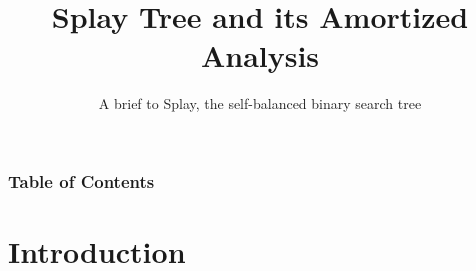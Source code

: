 \documentclass{beamer}
\title{Splay Tree and its Amortized Analysis}
\subtitle{A brief to Splay, the self-balanced binary search tree}
\begin{document}
    \begin{frame}
        \maketitle
    \end{frame}

    \begin{frame}
        \frametitle{Table of Contents}
    
        \tableofcontents
    
    \end{frame}

    \section{Introduction}
\end{document}
